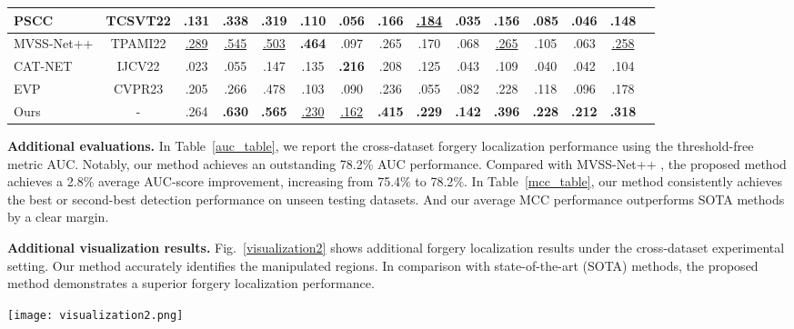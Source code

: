 \documentclass[10pt,journal,compsoc]{IEEEtran}
\begin{document}
\begin{table*}
{\begin{tabular}{lcccccccccccccc}
    PSCC \cite{liu2022pscc} & TCSVT22 & .131 & .338 & .319 & .110 & .056 & .166 & \underline{.184} & .035 & .156 & .085 & .046 & .148 \\ 
    \midrule 
    MVSS-Net++ \cite{dong2022mvss} & TPAMI22 & \underline{.289} & \underline{.545} & \underline{.503} & \textbf{.464} & {.097} & .265 & .170 & .068 & \underline{.265} & .105 & .063 & \underline{.258}\\	
    \midrule	
    CAT-NET \cite{kwon2022learning} & IJCV22 & .023 & .055 & .147 & .135 & \textbf{.216} & .208 & .125 & .043 & .109 & .040 & .042 & .104\\
    \midrule 											
    EVP \cite{liu2023evp} & CVPR23 & .205 & .266 & .478 & .103 & .090 & .236 & .055 & .082 & .228 & .118 & .096 & .178 \\	
    \midrule[1.5pt]
    Ours & - & .264 & \textbf{.630} & \textbf{.565} & \underline{.230} & \underline{.162} & \textbf{.415} & \textbf{.229} & \textbf{.142} & \textbf{.396} & \textbf{.228} & \textbf{.212} & \textbf{.318} \\
    \bottomrule
  \end{tabular}}
  \label{mcc_table}
\end{table*}

\newpage
\appendix
\noindent \textbf{Additional evaluations.} In Table~\ref{auc_table}, we report the cross-dataset forgery localization performance using the threshold-free metric AUC. Notably, our method achieves an outstanding 78.2\% AUC performance. Compared with MVSS-Net++ \cite{dong2022mvss}, the proposed method achieves a 2.8$\%$ average AUC-score improvement, increasing  from 75.4$\%$ to 78.2$\%$. In Table~\ref{mcc_table}, our method consistently achieves the best or second-best detection performance on unseen testing datasets. And our average MCC performance outperforms SOTA methods by a clear margin. 

\noindent \textbf{Additional visualization results.}
Fig.~\ref{visualization2} shows additional forgery localization results under the cross-dataset experimental setting. Our method accurately identifies the manipulated regions. In comparison with state-of-the-art (SOTA) methods, the proposed method demonstrates a superior forgery localization performance. 

\begin{figure*}[ht]
\centering
\texttt{[image:  visualization2.png]}
\caption{Additional forgery localization results on the 11 unseen test sets. The three left columns show the input images, corresponding ground-truth, and the localization results of our method. The right 10 columns present the results of SOTA methods.
}
\label{visualization2}
\end{figure*}
\end{document}
